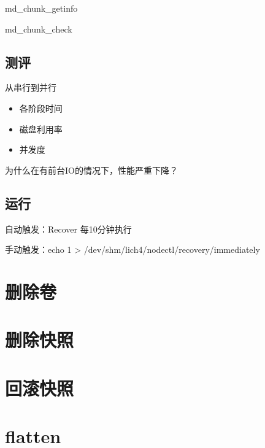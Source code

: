 md\_chunk\_getinfo

md\_chunk\_check

\subsection{测评}

从串行到并行

\begin{itemize}
    \item 各阶段时间
    \item 磁盘利用率
    \item 并发度
\end{itemize}

为什么在有前台IO的情况下，性能严重下降？

\subsection{运行}

\begin{tcolorbox}
    自动触发：Recover 每10分钟执行

    手动触发：echo 1 > /dev/shm/lich4/nodectl/recovery/immediately
\end{tcolorbox}

\section{删除卷}

\section{删除快照}

\section{回滚快照}

\section{flatten}
